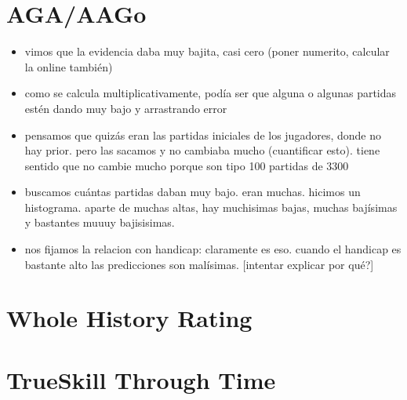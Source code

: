 \documentclass[a4paper,10pt]{report}
\begin{document}
\section*{AGA/AAGo}
\begin{itemize}
  \item vimos que la evidencia daba muy bajita, casi cero (poner numerito, calcular la online también)
  \item como se calcula multiplicativamente, podía ser que alguna o algunas partidas estén dando muy bajo y arrastrando error
  \item pensamos que quizás eran las partidas iniciales de los jugadores, donde no hay prior. pero las sacamos y no cambiaba mucho (cuantificar esto). tiene sentido que no cambie mucho porque son tipo 100 partidas de 3300
  \item buscamos cuántas partidas daban muy bajo. eran muchas. hicimos un histograma. aparte de muchas altas, hay muchisimas bajas, muchas bajísimas y bastantes muuuy bajisisimas.
  \item nos fijamos la relacion con handicap: claramente es eso. cuando el handicap es bastante alto las predicciones son malísimas. [intentar explicar por qué?]
\end{itemize}



\section*{Whole History Rating}

\section*{TrueSkill Through Time}


\end{document}
